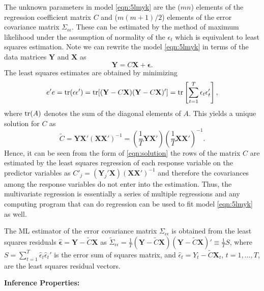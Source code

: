 The unknown parameters in model \eqref{eqn:5lmyk} are the ($mn$) elements of the regression coefficient matrix $C$ and ($m(m+1)/2$) elements of the error covariance matrix $\Sigma_{\epsilon \epsilon}$. These can be estimated by the method of maximum likelihood under the assumption of normality of the $\epsilon_t$ which is equivalent to least squares estimation. Note we can rewrite the model \eqref{eqn:5lmyk} in terms of the data matrices $\mathbf{Y}$ and $\mathbf{X}$ as
	\begin{equation} \label{eqn:rewrite}
	\mathbf{Y} = C \mathbf{X} + \mathbf{\epsilon}.
	\end{equation}
The least squares estimates are obtained by minimizing
	\begin{equation} \label{eqn:minimize}
	e'e= \tr (\epsilon\epsilon')= \tr [(\mathbf{Y} - C\mathbf{X}) (\mathbf{Y} - C \mathbf{X})']= \tr \left[\sum_{t=1}^T \epsilon_t \epsilon_t' \right],
	\end{equation}
where $\operatorname{tr}(A)$ denotes the sum of the diagonal elements of $A$. This yields a unique solution for $C$ as
	\begin{equation} \label{eqn:solution}
	\tilde{C}= \mathbf{Y} \mathbf{X}' (\mathbf{X} \mathbf{X}')^{-1} = \left( \dfrac{1}{T} \mathbf{Y}\mathbf{X}' \right) \left( \dfrac{1}{T} \mathbf{X} \mathbf{X}' \right)^{-1}.
	\end{equation}
Hence, it can be seen from the form of \eqref{eqn:solution} the rows of the matrix $C$ are estimated by the least squares regression of each response variable on the predictor variables as $C'_j= (\mathbf{Y}_j' \mathbf{X})(\mathbf{X}\mathbf{X}')^{-1}$ and therefore the covariances among the response variables do not enter into the estimation. Thus, the multivariate regression is essentially a series of multiple regressions and any computing program that can do regression can be used to fit model \eqref{eqn:5lmyk} as well. 


The ML estimator of the error covariance matrix $\Sigma_{\epsilon\epsilon}$ is obtained from the least squares residuals $\hat{\mathbf{\epsilon}}= \mathbf{Y} - \tilde{C} \mathbf{X}$ as $\tilde{\Sigma}_{\epsilon\epsilon}= \frac{1}{T}(\mathbf{Y} - \tilde{C}\mathbf{X})(\mathbf{Y} - \tilde{C} \mathbf{X})' \equiv \frac{1}{T}S$, where $S= \sum_{t=1}^T \hat{\epsilon}_t \hat{\epsilon}_t'$ is the error sum of squares matrix, and $\hat{\epsilon}_t= Y_t - \tilde{C} \mathbf{X}_t$, $t=1,\ldots,T$, are the least squares residual vectors. \twomedskip


\noindent\textbf{Inference Properties:} \twomedskip


